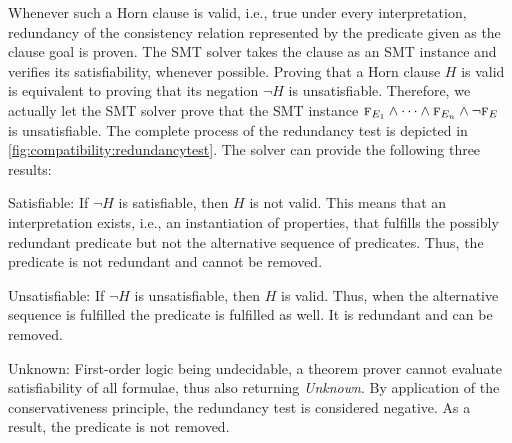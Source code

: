 Whenever such a Horn clause is valid, i.e., true under every interpretation, redundancy of the consistency relation represented by the predicate given as the clause goal is proven.
The \gls{SMT} solver takes the clause as an \gls{SMT} instance and verifies its satisfiability, whenever possible.
Proving that a Horn clause $H$ is valid is equivalent to proving that its negation $\neg H$ is unsatisfiable.
Therefore, we actually let the \gls{SMT} solver prove that the \gls{SMT} instance $\textsc{f}_{E_1} \wedge \dots \wedge \textsc{f}_{E_n} \wedge \neg \textsc{f}_{E}$ is unsatisfiable.
The complete process of the redundancy test is depicted in \autoref{fig:compatibility:redundancytest}.
The solver can provide the following three results:
\begin{properdescription}
    \item[Satisfiable:] If $\neg H$ is satisfiable, then $H$ is not valid. This means that an interpretation exists, i.e., an instantiation of properties, that fulfills the possibly redundant predicate but not the alternative sequence of predicates. Thus, the predicate is not redundant and cannot be removed.
    \item[Unsatisfiable:] If $\neg H$ is unsatisfiable, then $H$ is valid. Thus, when the alternative sequence is fulfilled the predicate is fulfilled as well. It is redundant and can be removed.
    \item[Unknown:] First-order logic being undecidable, a theorem prover cannot evaluate satisfiability of all formulae, thus also returning \emph{Unknown}. By application of the conservativeness principle, the redundancy test is considered negative. As a result, the predicate is not removed.
\end{properdescription}



